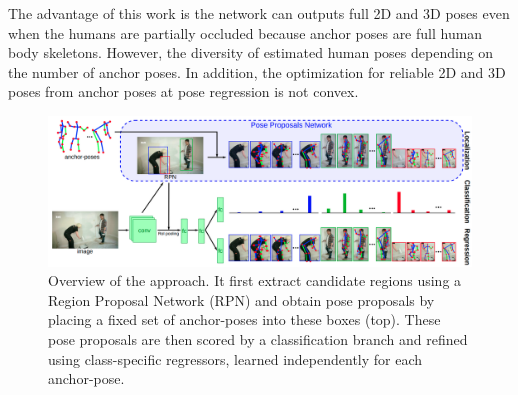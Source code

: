  The advantage of this work is the network can outputs full 2D and 3D poses even when the humans are partially occluded because anchor poses are full human body skeletons. However, the diversity of estimated human poses depending on the number of anchor poses. In addition, the optimization for reliable 2D and 3D poses from anchor poses at pose regression is not convex.
 \begin{figure}
 	\centering
 	\includegraphics[width=1.0\columnwidth]{figures/ch3/overview-lcn.png}
 	\caption{Overview of the \cite{LCR2019} approach. It first extract candidate regions using a Region
 		Proposal Network (RPN) and obtain pose proposals by placing a fixed set of anchor-poses into these boxes (top). These pose proposals are then scored by a classification branch and refined using class-specific regressors, learned independently for each anchor-pose.} 
 	\label{fig:ch3-overview-lcn}
 \end{figure}

